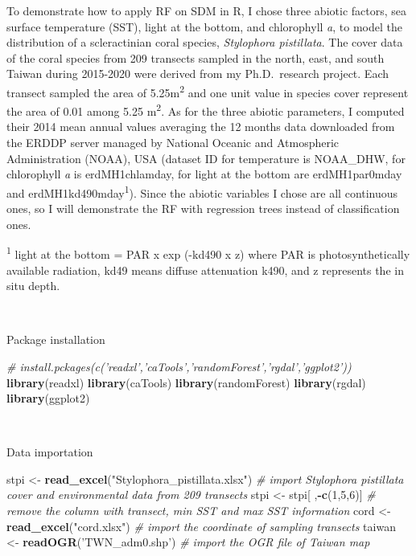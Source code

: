 \documentclass[
]{article}
\newenvironment{Shaded}{\begin{snugshade}}{\end{snugshade}}
\newcommand{\CommentTok}[1]{\textcolor[rgb]{0.56,0.35,0.01}{\textit{#1}}}
\newcommand{\DecValTok}[1]{\textcolor[rgb]{0.00,0.00,0.81}{#1}}
\newcommand{\KeywordTok}[1]{\textcolor[rgb]{0.13,0.29,0.53}{\textbf{#1}}}
\newcommand{\NormalTok}[1]{#1}
\newcommand{\OperatorTok}[1]{\textcolor[rgb]{0.81,0.36,0.00}{\textbf{#1}}}
\newcommand{\StringTok}[1]{\textcolor[rgb]{0.31,0.60,0.02}{#1}}
\begin{document}
To demonstrate how to apply RF on SDM in R, I chose three abiotic
factors, sea surface temperature (SST), light at the bottom, and
chlorophyll \emph{a}, to model the distribution of a scleractinian coral
species, \emph{Stylophora pistillata}. The cover data of the coral
species from 209 transects sampled in the north, east, and south Taiwan
during 2015-2020 were derived from my Ph.D.~research project. Each
transect sampled the area of 5.25m\textsuperscript{2} and one unit value
in species cover represent the area of 0.01 among 5.25
m\textsuperscript{2}. As for the three abiotic parameters, I computed
their 2014 mean annual values averaging the 12 months data downloaded
from the ERDDP server managed by National Oceanic and Atmospheric
Administration (NOAA), USA (dataset ID for temperature is NOAA\_DHW, for
chlorophyll \emph{a} is erdMH1chlamday, for light at the bottom are
erdMH1par0mday and erdMH1kd490mday\textsuperscript{1}). Since the
abiotic variables I chose are all continuous ones, so I will demonstrate
the RF with regression trees instead of classification ones.

\textsuperscript{1} light at the bottom = PAR x exp (-kd490 x z) where
PAR is photosynthetically available radiation, kd49 means diffuse
attenuation k490, and z represents the in situ depth.

~

Package installation

\begin{Shaded}
\begin{Highlighting}[]
\CommentTok{# install.pckages(c('readxl','caTools','randomForest','rgdal','ggplot2'))}
\KeywordTok{library}\NormalTok{(readxl)}
\KeywordTok{library}\NormalTok{(caTools)}
\KeywordTok{library}\NormalTok{(randomForest)}
\KeywordTok{library}\NormalTok{(rgdal)}
\KeywordTok{library}\NormalTok{(ggplot2)}
\end{Highlighting}
\end{Shaded}

~

Data importation

\begin{Shaded}
\begin{Highlighting}[]
\NormalTok{stpi <-}\StringTok{ }\KeywordTok{read_excel}\NormalTok{(}\StringTok{"Stylophora_pistillata.xlsx"}\NormalTok{) }\CommentTok{# import Stylophora pistillata cover and environmental data from 209 transects}
\NormalTok{stpi <-}\StringTok{ }\NormalTok{stpi[ ,}\OperatorTok{-}\KeywordTok{c}\NormalTok{(}\DecValTok{1}\NormalTok{,}\DecValTok{5}\NormalTok{,}\DecValTok{6}\NormalTok{)] }\CommentTok{# remove the column with transect, min SST and max SST information}
\NormalTok{cord <-}\StringTok{ }\KeywordTok{read_excel}\NormalTok{(}\StringTok{"cord.xlsx"}\NormalTok{) }\CommentTok{# import the coordinate of sampling transects}
\NormalTok{taiwan <-}\StringTok{ }\KeywordTok{readOGR}\NormalTok{(}\StringTok{'TWN_adm0.shp'}\NormalTok{) }\CommentTok{# import the OGR file of Taiwan map }
\end{Highlighting}
\end{Shaded}
\end{document}
